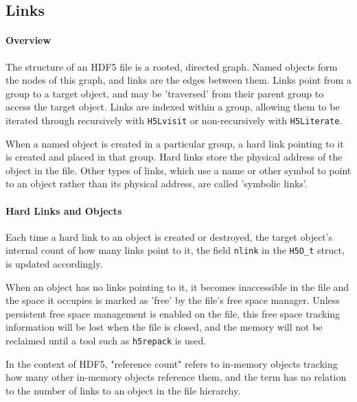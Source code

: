 \subsection{Links}

\paragraph{Overview} The structure of an HDF5 file is a rooted, directed graph. Named objects form the nodes of this graph, and links are the edges between them. Links point from a group to a target object, and may be 'traversed' from their parent group to access the target object. Links are indexed within a group, allowing them to be iterated through recursively with \texttt{H5Lvisit} or non-recursively with \texttt{H5Literate}. 

When a named object is created in a particular group, a hard link pointing to it is created and placed in that group. Hard links store the physical address of the object in the file. Other types of links, which use a name or other symbol to point to an object rather than its physical address, are called 'symbolic links'.

\paragraph{Hard Links and Objects} Each time a hard link to an object is created or destroyed, the target object's internal count of how many links point to it, the field \texttt{nlink} in the \texttt{H5O\_t} struct, is updated accordingly.

When an object has no links pointing to it, it becomes inaccessible in the file and the space it occupies is marked as 'free' by the file's free space manager. Unless persistent free space management is enabled on the file, this free space tracking information will be lost when the file is closed, and the memory will not be reclaimed until a tool such as \texttt{h5repack} is used.

In the context of HDF5, "reference count" refers to in-memory objects tracking how many other in-memory objects reference them, and the term has no relation to the number of links to an object in the file hierarchy.

